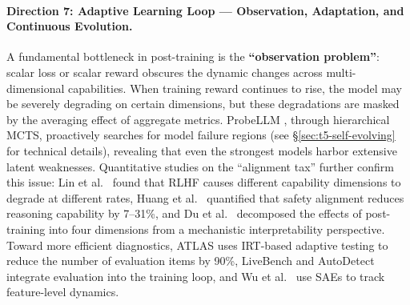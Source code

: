\paragraph{Direction 7: Adaptive Learning Loop --- Observation, Adaptation, and Continuous Evolution.}
A fundamental bottleneck in post-training is the \textbf{``observation problem''}:
scalar loss or scalar reward obscures the dynamic changes across multi-dimensional capabilities.
When training reward continues to rise, the model may be severely degrading on certain dimensions,
but these degradations are masked by the averaging effect of aggregate metrics.
ProbeLLM \cite{huang2026probellm}, through hierarchical MCTS,
proactively searches for model failure regions (see \S\ref{sec:t5-self-evolving} for technical details),
revealing that even the strongest models harbor extensive latent weaknesses.
Quantitative studies on the ``alignment tax'' further confirm this issue:
Lin et al.\ \cite{lin2024alignmenttax} found that RLHF causes different capability dimensions to degrade at different rates,
Huang et al.\ \cite{huang2025safetytax} quantified that safety alignment reduces reasoning capability by 7--31\%,
and Du et al.\ \cite{du2025reshaping}
decomposed the effects of post-training into four dimensions from a mechanistic interpretability perspective.
Toward more efficient diagnostics,
ATLAS \cite{li2025atlas} uses IRT-based adaptive testing to reduce the number of evaluation items by 90\%,
LiveBench \cite{white2024livebench} and AutoDetect \cite{cheng2024autodetect}
integrate evaluation into the training loop,
and Wu et al.\ \cite{wu2024featuretracking} use SAEs to track feature-level dynamics.

